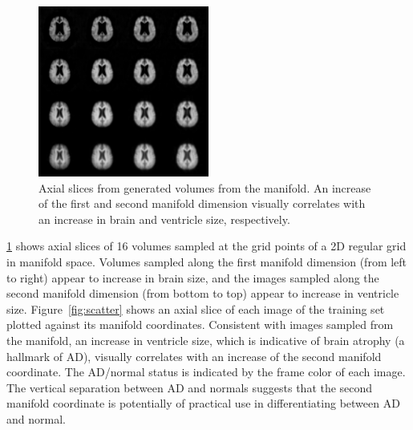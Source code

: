 \begin{figure}[tb!]
\centering
\includegraphics[width=0.5\textwidth, trim=0 0em 0 0]
  {figures/MICCAI2013_sampled2d}

\caption[Axial slices from generated volumes from the manifold]{Axial slices
from generated volumes from the manifold. An increase of the first and second manifold dimension visually correlates with an increase in
brain and ventricle size, respectively.}
\label{fig:generated}
\end{figure}

\ref{fig:generated} shows axial slices of 16 volumes sampled at the
grid points of a 2D regular grid in manifold space. Volumes sampled along the
first manifold dimension (from left to right) appear to increase in brain size,
and the images sampled along the second manifold dimension (from bottom to top)
appear to increase in ventricle size. Figure~\ref{fig:scatter} shows an axial slice of
each image of the training set plotted against its manifold coordinates.
Consistent with images sampled from the manifold, an increase in ventricle size,
which is indicative of brain atrophy (a hallmark of AD), visually correlates
with an increase of the second manifold coordinate.
The AD/normal status is indicated by the frame color of each image. The vertical
separation between AD and normals suggests that the second manifold coordinate is
potentially of practical use in differentiating between AD and normal.

